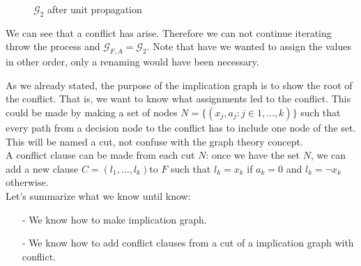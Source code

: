 \begin{example}
\begin{figure}[H]
  \centering
  \caption{$\mathcal{G}_2$ after unit propagation}
\end{figure}

We can see that a conflict has arise. Therefore we can not continue iterating throw the process and $\mathcal{G}_{F,A} = \mathcal{G}_2$. Note that have we wanted to assign the values in other order, only a renaming would have been necessary. 
\end{example}
As we already stated, the purpose of the implication graph is to show the root of the conflict. That is, we want to know what assignments led to the conflict. This could be made by making a set of nodes $N=\{(x_j,a_j: j\in 1,...,k)\}$ such that every path from a decision node to the conflict has to include one node of the set. This will be named a cut, not confuse with the graph theory concept.\\


A conflict clause can be made from each cut $N$: once we have the set $N$, we can add a new clause $C = (l_1,...,l_k)$to $F$ such that $l_k = x_k$ if $a_k = 0$ and $l_k=\neg x_k$ otherwise.\\

Let's summarize what we know until know:
\begin{itemize}
\item[-] We know how to make implication graph.
\item[-] We know how to add conflict clauses from a cut of a implication graph with conflict.  
\end{itemize}

